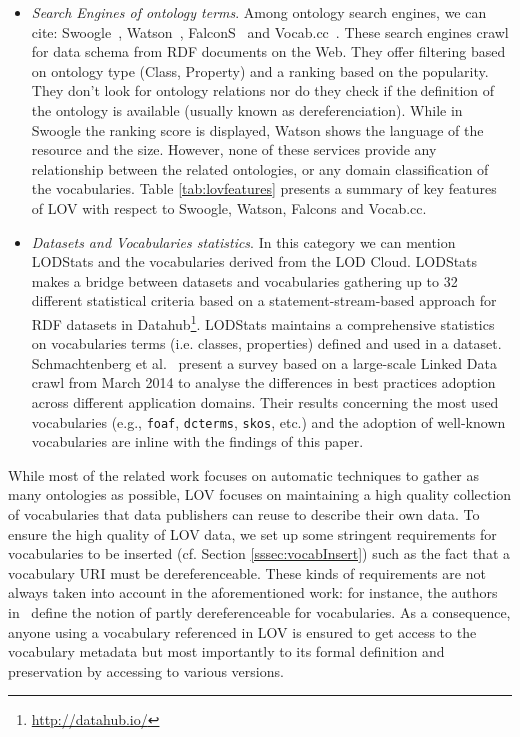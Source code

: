 \documentclass{iosart2c}
\begin{document}
\begin{itemize}
 \item \textit{Search Engines of ontology terms}. Among ontology search engines, we can cite: Swoogle~\cite{finin2005swoogle}, Watson~\cite{d2007watson,Sabou07}, FalconS~\cite{cheng2008falcons} and Vocab.cc~\cite{vocabcc2013}. These search engines crawl for data schema from RDF documents on the Web. They offer filtering based on ontology type (Class, Property) and a ranking based on the popularity. They don't look for ontology relations nor do they check if the definition of the ontology is available (usually known as dereferenciation). While in Swoogle the ranking score is displayed, Watson shows the language of the resource and the size. However, none of these services provide any relationship between the related ontologies, or any domain classification of the vocabularies. Table \ref{tab:lovfeatures} presents a summary of key features of LOV with respect to Swoogle, Watson, Falcons and Vocab.cc.
 \item \textit{Datasets and Vocabularies statistics}. In this category we can mention LODStats \cite{demter-2012-ekaw} and the vocabularies derived from the LOD Cloud.  LODStats makes a bridge between datasets and vocabularies gathering up to 32 different statistical criteria based on a statement-stream-based approach for RDF datasets in Datahub\footnote{\url{http://datahub.io/}}. LODStats maintains a comprehensive statistics on vocabularies terms (i.e. classes, properties) defined and used in a dataset. Schmachtenberg et al.~\cite{max2014} present a survey based on a large-scale Linked Data crawl from March 2014 to analyse the differences in best practices adoption across different application domains. Their results concerning the most used vocabularies (e.g., \texttt{foaf}, \texttt{dcterms}, \texttt{skos}, etc.) and the adoption of well-known vocabularies are inline with the findings of this paper.
\end{itemize}


While most of the related work focuses on automatic techniques to gather as many ontologies as possible, LOV focuses on maintaining a high quality collection of vocabularies that data publishers can reuse to describe their own data. To ensure the high quality of LOV data, we set up some stringent requirements for vocabularies to be inserted (cf. Section \ref{sssec:vocabInsert}) such as the fact that a vocabulary URI must be dereferenceable. These kinds of requirements are not always taken into account in the aforementioned work: for instance, the authors in~\cite{max2014} define the notion of partly dereferenceable for vocabularies. As a consequence, anyone using a vocabulary referenced in LOV is ensured to get access to the vocabulary metadata but most importantly to its formal definition and preservation by accessing to various versions. 
\end{document}
